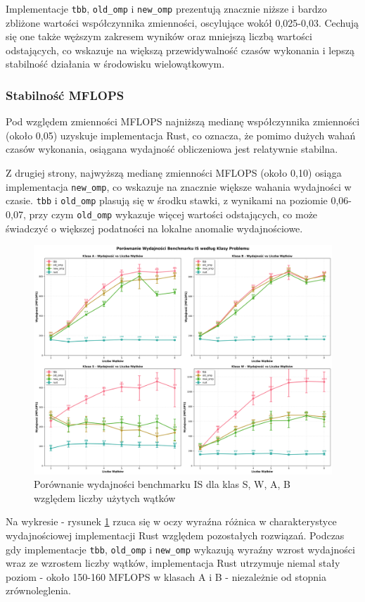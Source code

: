 Implementacje \texttt{tbb}, \texttt{old\_omp} i \texttt{new\_omp} prezentują znacznie niższe i bardzo zbliżone wartości współczynnika zmienności, oscylujące wokół 0,025-0,03. Cechują się one także węższym zakresem wyników oraz mniejszą liczbą wartości odstających, co wskazuje na większą przewidywalność czasów wykonania i lepszą stabilność działania w środowisku wielowątkowym.

\subsubsection{Stabilność MFLOPS}
Pod względem zmienności MFLOPS najniższą medianę współczynnika zmienności (około 0,05) uzyskuje implementacja Rust, co oznacza, że pomimo dużych wahań czasów wykonania, osiągana wydajność obliczeniowa jest relatywnie stabilna.

Z drugiej strony, najwyższą medianę zmienności MFLOPS (około 0,10) osiąga implementacja \texttt{new\_omp}, co wskazuje na znacznie większe wahania wydajności w czasie. \texttt{tbb} i \texttt{old\_omp} plasują się w środku stawki, z wynikami na poziomie 0,06-0,07, przy czym \texttt{old\_omp} wykazuje więcej wartości odstających, co może świadczyć o większej podatności na lokalne anomalie wydajnościowe.


\begin{figure}[H]
    \centering
    \includegraphics[width=\textwidth]{analiza/images/parallel/is/x86/is_porownanie_wydajnosci.png}
    \caption{Porównanie wydajności benchmarku IS dla klas S, W, A, B względem liczby użytych wątków}
    \label{is_porownanie_wydajnosci_x86}
\end{figure}
Na wykresie - rysunek \ref{is_porownanie_wydajnosci_x86} rzuca się w oczy wyraźna różnica w charakterystyce wydajnościowej implementacji Rust względem pozostałych rozwiązań. Podczas gdy implementacje \texttt{tbb}, \texttt{old\_omp} i \texttt{new\_omp} wykazują wyraźny wzrost wydajności wraz ze wzrostem liczby wątków, implementacja Rust utrzymuje niemal stały poziom - około 150-160 MFLOPS w klasach A i B - niezależnie od stopnia zrównoleglenia.

